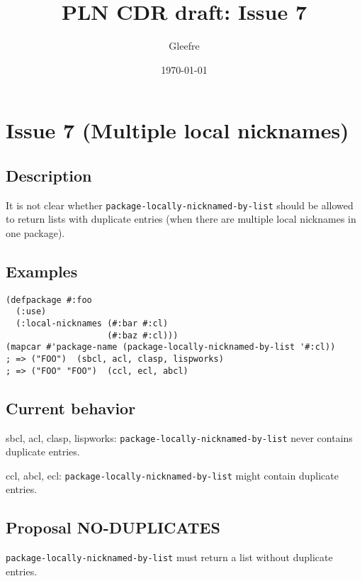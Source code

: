 \documentclass[11pt]{article}
\author{Gleefre}
\date{\today}
\title{PLN CDR draft: Issue 7}
\begin{document}
\maketitle

\section{Issue 7 (Multiple local nicknames)}
\label{sec:org0f497cd}
\subsection{Description}
\label{sec:org942f20b}
It is not clear whether \texttt{package-locally-nicknamed-by-list} should be allowed to return
lists with duplicate entries (when there are multiple local nicknames in one package).
\subsection{Examples}
\label{sec:orgee2b4f0}
\begin{verbatim}
(defpackage #:foo
  (:use)
  (:local-nicknames (#:bar #:cl)
                    (#:baz #:cl)))
(mapcar #'package-name (package-locally-nicknamed-by-list '#:cl))
; => ("FOO")  (sbcl, acl, clasp, lispworks)
; => ("FOO" "FOO")  (ccl, ecl, abcl)
\end{verbatim}
\subsection{Current behavior}
\label{sec:orgf3c62b5}
sbcl, acl, clasp, lispworks:
  \texttt{package-locally-nicknamed-by-list} never contains duplicate entries.

ccl, abcl, ecl:
  \texttt{package-locally-nicknamed-by-list} might contain duplicate entries.
\subsection{Proposal NO-DUPLICATES}
\label{sec:orgaebf5d8}
\texttt{package-locally-nicknamed-by-list} must return a list without duplicate entries.
\end{document}
